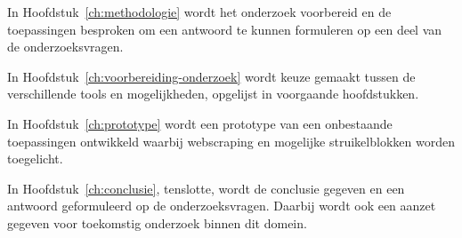 In Hoofdstuk~\ref{ch:methodologie} wordt het onderzoek voorbereid en de toepassingen besproken om een antwoord te kunnen formuleren op een deel van de onderzoeksvragen.


In Hoofdstuk~\ref{ch:voorbereiding-onderzoek} wordt keuze gemaakt tussen de verschillende tools en mogelijkheden, opgelijst in voorgaande hoofdstukken.

In Hoofdstuk~\ref{ch:prototype} wordt een prototype van een onbestaande toepassingen ontwikkeld waarbij webscraping en mogelijke struikelblokken worden toegelicht.

In Hoofdstuk~\ref{ch:conclusie}, tenslotte, wordt de conclusie gegeven en een antwoord geformuleerd op de onderzoeksvragen. Daarbij wordt ook een aanzet gegeven voor toekomstig onderzoek binnen dit domein.